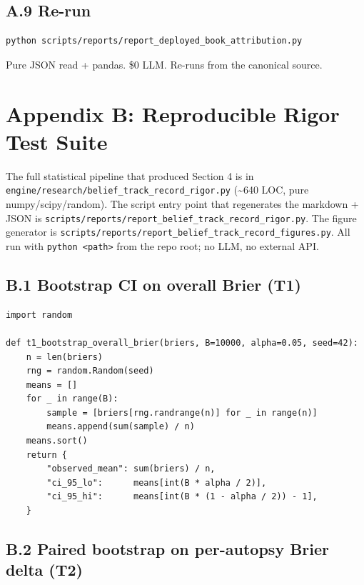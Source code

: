 \documentclass[11pt,a4paper]{article}
\begin{document}
\subsection{A.9 Re-run}

\begin{lstlisting}
python scripts/reports/report_deployed_book_attribution.py
\end{lstlisting}

Pure JSON read + pandas. \$0 LLM. Re-runs from the canonical source.

\section{Appendix B: Reproducible Rigor Test Suite}

The full statistical pipeline that produced Section 4 is in \texttt{engine/research/belief\_track\_record\_rigor.py} (\textasciitilde{}640 LOC, pure numpy/scipy/random). The script entry point that regenerates the markdown + JSON is \texttt{scripts/reports/report\_belief\_track\_record\_rigor.py}. The figure generator is \texttt{scripts/reports/report\_belief\_track\_record\_figures.py}. All run with \texttt{python <path>} from the repo root; no LLM, no external API.

\subsection{B.1 Bootstrap CI on overall Brier (T1)}

\begin{lstlisting}
import random

def t1_bootstrap_overall_brier(briers, B=10000, alpha=0.05, seed=42):
    n = len(briers)
    rng = random.Random(seed)
    means = []
    for _ in range(B):
        sample = [briers[rng.randrange(n)] for _ in range(n)]
        means.append(sum(sample) / n)
    means.sort()
    return {
        "observed_mean": sum(briers) / n,
        "ci_95_lo":      means[int(B * alpha / 2)],
        "ci_95_hi":      means[int(B * (1 - alpha / 2)) - 1],
    }
\end{lstlisting}

\subsection{B.2 Paired bootstrap on per-autopsy Brier delta (T2)}
\end{document}
